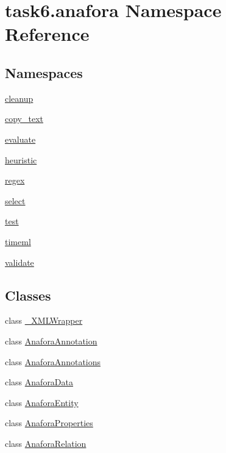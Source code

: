 \hypertarget{namespacetask6_1_1anafora}{}\section{task6.\+anafora Namespace Reference}
\label{namespacetask6_1_1anafora}
\subsection*{Namespaces}
\begin{DoxyCompactItemize}
\item 
 \hyperlink{namespacetask6_1_1anafora_1_1cleanup}{cleanup}
\item 
 \hyperlink{namespacetask6_1_1anafora_1_1copy__text}{copy\+\_\+text}
\item 
 \hyperlink{namespacetask6_1_1anafora_1_1evaluate}{evaluate}
\item 
 \hyperlink{namespacetask6_1_1anafora_1_1heuristic}{heuristic}
\item 
 \hyperlink{namespacetask6_1_1anafora_1_1regex}{regex}
\item 
 \hyperlink{namespacetask6_1_1anafora_1_1select}{select}
\item 
 \hyperlink{namespacetask6_1_1anafora_1_1test}{test}
\item 
 \hyperlink{namespacetask6_1_1anafora_1_1timeml}{timeml}
\item 
 \hyperlink{namespacetask6_1_1anafora_1_1validate}{validate}
\end{DoxyCompactItemize}
\subsection*{Classes}
\begin{DoxyCompactItemize}
\item 
class \hyperlink{classtask6_1_1anafora_1_1__XMLWrapper}{\+\_\+\+X\+M\+L\+Wrapper}
\item 
class \hyperlink{classtask6_1_1anafora_1_1AnaforaAnnotation}{Anafora\+Annotation}
\item 
class \hyperlink{classtask6_1_1anafora_1_1AnaforaAnnotations}{Anafora\+Annotations}
\item 
class \hyperlink{classtask6_1_1anafora_1_1AnaforaData}{Anafora\+Data}
\item 
class \hyperlink{classtask6_1_1anafora_1_1AnaforaEntity}{Anafora\+Entity}
\item 
class \hyperlink{classtask6_1_1anafora_1_1AnaforaProperties}{Anafora\+Properties}
\item 
class \hyperlink{classtask6_1_1anafora_1_1AnaforaRelation}{Anafora\+Relation}
\end{DoxyCompactItemize}
